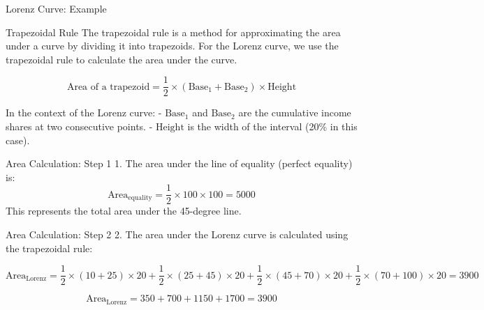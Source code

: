 \documentclass{beamer}
\begin{document}
\begin{frame}{Lorenz Curve: Example }


\end{frame}

\begin{frame}{Trapezoidal Rule}
The trapezoidal rule is a method for approximating the area under a curve by dividing it into trapezoids. For the Lorenz curve, we use the trapezoidal rule to calculate the area under the curve.

\[
\text{Area of a trapezoid} = \frac{1}{2} \times (\text{Base}_1 + \text{Base}_2) \times \text{Height}
\]

In the context of the Lorenz curve:
- \(\text{Base}_1\) and \(\text{Base}_2\) are the cumulative income shares at two consecutive points.
- \(\text{Height}\) is the width of the interval (20\% in this case).
\end{frame}

\begin{frame}{Area Calculation: Step 1}
1. The area under the line of equality (perfect equality) is:
\[
\text{Area}_{\text{equality}} = \frac{1}{2} \times 100 \times 100 = 5000
\]
This represents the total area under the 45-degree line.
\end{frame}

\begin{frame}{Area Calculation: Step 2}
2. The area under the Lorenz curve is calculated using the trapezoidal rule:
\begin{scriptsize}

\[
\text{Area}_{\text{Lorenz}} = \frac{1}{2} \times (10 + 25) \times 20 + \frac{1}{2} \times (25 + 45) \times 20 + \frac{1}{2} \times (45 + 70) \times 20 + \frac{1}{2} \times (70 + 100) \times 20 = 3900
\]

\end{scriptsize}
\[
\text{Area}_{\text{Lorenz}} = 350 + 700 + 1150 + 1700 = 3900
\]
\end{frame}
\end{document}
